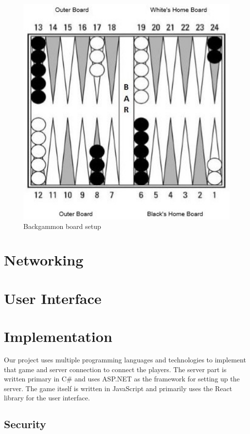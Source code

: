\documentclass[ twoside,openright,titlepage,numbers=noenddot,headinclude,%
                footinclude=true,cleardoublepage=empty,abstractoff, %
                BCOR=5mm,paper=a4,fontsize=11pt,%
                ngerman,american,%
                ]{scrreprt}
\begin{document}
\begin{figure}[H]
    \centering
    \includegraphics[width=1\textwidth]{gfx/Backgammon-setup.jpg}
    \caption{Backgammon board setup}
    \label{fig:backgammon_board_setup}
\end{figure}

\section{Networking}


\section{User Interface}

\section{Implementation}
Our project uses multiple programming languages and technologies to implement that game and server connection to connect the players. The server part is written primary in C\# and uses ASP.NET as the framework for setting up the server. The game itself is written in JavaScript and primarily uses the React library for the user interface.

\subsection{Security}
\end{document}
